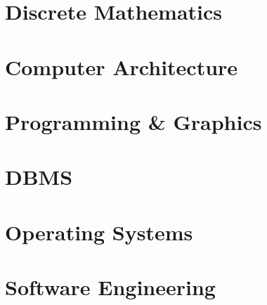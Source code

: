 \endgroup

\needspace{95pt}

\hypertarget{rev-formula--discrete-mathematics}{%
\section{Discrete Mathematics}\label{rev-formula--discrete-mathematics}}



\needspace{95pt}

\hypertarget{rev-formula--computer-architecture}{%
\section{Computer Architecture}\label{rev-formula--computer-architecture}}



\needspace{95pt}

\hypertarget{rev-formula--programming--graphics}{%
\section{Programming \& Graphics}\label{rev-formula--programming--graphics}}



\needspace{95pt}

\hypertarget{rev-formula--dbms}{%
\section{DBMS}\label{rev-formula--dbms}}



\needspace{95pt}

\hypertarget{rev-formula--operating-systems}{%
\section{Operating Systems}\label{rev-formula--operating-systems}}



\needspace{95pt}

\hypertarget{rev-formula--software-engineering}{%
\section{Software Engineering}\label{rev-formula--software-engineering}}



